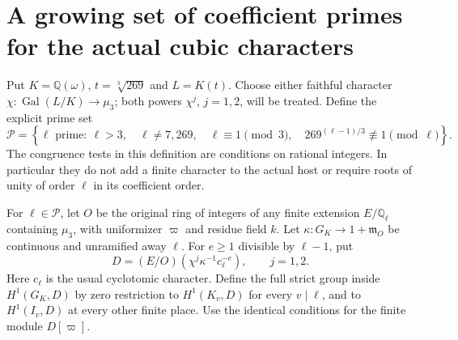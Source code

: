 \section{A growing set of coefficient primes for the actual cubic characters}
\label{sec:mixed-cubic-split-prime-strict}

Put $K=\mathbb Q(\omega)$, $t=\sqrt[3]{269}$ and $L=K(t)$.
Choose either faithful character
$\chi:\operatorname{Gal}(L/K)\to\mu_3$; both powers $\chi^j$,
$j=1,2$, will be treated.  Define the explicit prime set
\[
 \mathscr P=\left\{\ell\text{ prime}:\ \ell>3,\quad
 \ell\ne7,269,\quad \ell\equiv1\pmod3,\quad
       269^{(\ell-1)/3}\not\equiv1\pmod\ell\right\}.
 \tag{MCP.1}
\]
The congruence tests in this definition are conditions on rational
integers.  In particular they do not add a finite character to the
actual host or require roots of unity of order $\ell$ in its
coefficient order.

For $\ell\in\mathscr P$, let $O$ be the original ring of integers
of any finite extension $E/\mathbb Q_\ell$ containing $\mu_3$,
with uniformizer $\varpi$ and residue field $k$.  Let
$\kappa:G_K\to1+\mathfrak m_O$ be continuous and unramified
away $\ell$.  For $e\geq1$ divisible by $\ell-1$, put
\[
        D=(E/O)(\chi^j\kappa^{-1}c_\ell^{-e}),\qquad j=1,2.
 \tag{MCP.2}
\]
Here $c_\ell$ is the usual cyclotomic character.  Define the full
strict group inside $H^1(G_K,D)$ by zero restriction to $H^1(K_v,D)$ for every
$v\mid\ell$, and to $H^1(I_v,D)$ at every other finite place.
Use the identical conditions for the finite module $D[\varpi]$.

